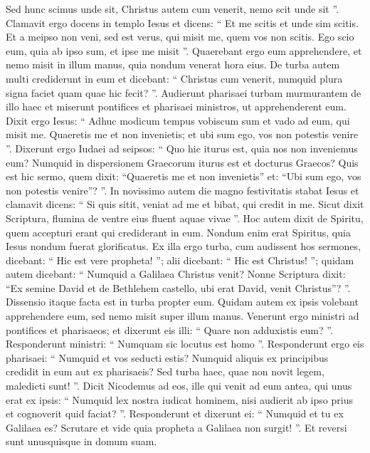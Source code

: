 \begin{biblechapter}
\begin{biblechapter}
\begin{biblechapter}
\begin{biblechapter}
\begin{biblechapter}
\begin{biblechapter}
\begin{biblechapter}
\verse Sed hunc scimus unde sit, Christus autem cum venerit, nemo scit unde sit ”. 
\verse Clamavit ergo docens in templo Iesus et dicens: “ Et me scitis et unde sim scitis. Et a meipso non veni, sed est verus, qui misit me, quem vos non scitis. 
\verse Ego scio eum, quia ab ipso sum, et ipse me misit ”. 
\verse Quaerebant ergo eum apprehendere, et nemo misit in illum manus, quia nondum venerat hora eius. 
\verse De turba autem multi crediderunt in eum et dicebant: “ Christus cum venerit, numquid plura signa faciet quam quae hic fecit? ”.
 \verse Audierunt pharisaei turbam murmurantem de illo haec et miserunt pontifices et pharisaei ministros, ut apprehenderent eum. 
\verse Dixit ergo Iesus: “ Adhuc modicum tempus vobiscum sum et vado ad eum, qui misit me. 
\verse Quaeretis me et non invenietis; et ubi sum ego, vos non potestis venire ”. 
\verse Dixerunt ergo Iudaei ad seipsos: “ Quo hic iturus est, quia nos non inveniemus eum? Numquid in dispersionem Graecorum iturus est et docturus Graecos? 
\verse Quis est hic sermo, quem dixit: “Quaeretis me et non invenietis” et: “Ubi sum ego, vos non potestis venire”? ”.
 \verse In novissimo autem die magno festivitatis stabat Iesus et clamavit dicens: “ Si quis sitit, veniat ad me et bibat, 
\verse qui credit in me. Sicut dixit Scriptura, flumina de ventre eius fluent aquae vivae ”. 
\verse Hoc autem dixit de Spiritu, quem accepturi erant qui crediderant in eum. Nondum enim erat Spiritus, quia Iesus nondum fuerat glorificatus.
 \verse Ex illa ergo turba, cum audissent hos sermones, dicebant: “ Hic est vere propheta! ”; 
\verse alii dicebant: “ Hic est Christus! ”; quidam autem dicebant: “ Numquid a Galilaea Christus venit? 
\verse Nonne Scriptura dixit: “Ex semine David et de Bethlehem castello, ubi erat David, venit Christus”? ”. 
\verse Dissensio itaque facta est in turba propter eum.
 \verse Quidam autem ex ipsis volebant apprehendere eum, sed nemo misit super illum manus. 
\verse Venerunt ergo ministri ad pontifices et pharisaeos; et dixerunt eis illi: “ Quare non adduxistis eum? ”. 
\verse Responderunt ministri: “ Numquam sic locutus est homo ”. 
\verse Responderunt ergo eis pharisaei: “ Numquid et vos seducti estis? 
\verse Numquid aliquis ex principibus credidit in eum aut ex pharisaeis? 
\verse Sed turba haec, quae non novit legem, maledicti sunt! ”. 
 \verse Dicit Nicodemus ad eos, ille qui venit ad eum antea, qui unus erat ex ipsis: 
 \verse “ Numquid lex nostra iudicat hominem, nisi audierit ab ipso prius et cognoverit quid faciat? ”. 
\verse Responderunt et dixerunt ei: “ Numquid et tu ex Galilaea es? Scrutare et vide quia propheta a Galilaea non surgit! ”. 
\verse Et reversi sunt unusquisque in domum suam.
 

\end{biblechapter}
\end{biblechapter}
\end{biblechapter}
\end{biblechapter}
\end{biblechapter}
\end{biblechapter}
\end{biblechapter}

